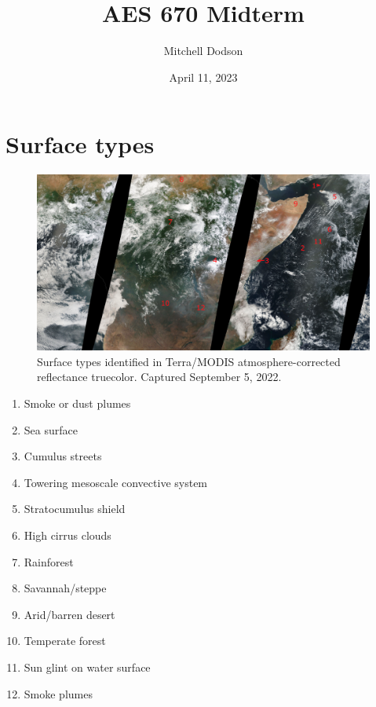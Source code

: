 \documentclass[12pt]{article}
\title{AES 670 Midterm}
\author{Mitchell Dodson}
\date{April 11, 2023}
\begin{document}
\maketitle

\section{Surface types}

\begin{figure}[h!]
    \centering
    \includegraphics[width=.98\linewidth]{figures/aes670_midterm_numbered.png}

    \caption{Surface types identified in Terra/MODIS atmosphere-corrected reflectance truecolor. Captured September 5, 2022.}
    \label{q1_numbered}
\end{figure}

\begin{multicols}{2}
\begin{enumerate}
    \item{Smoke or dust plumes}
    \item{Sea surface}
    \item{Cumulus streets}
    \item{Towering mesoscale convective system}
    \item{Stratocumulus shield}
    \item{High cirrus clouds}
    \item{Rainforest}
    \item{Savannah/steppe}
    \item{Arid/barren desert}
    \item{Temperate forest}
    \item{Sun glint on water surface}
    \item{Smoke plumes}
\end{enumerate}
\end{multicols}
\end{document}
